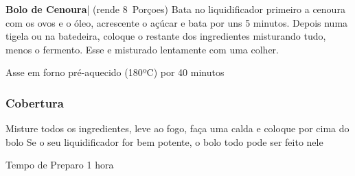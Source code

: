 \documentclass[10pt,a4paper]{article}
\begin{document}
 
\begin{recipe}{\textbf{Bolo de Cenoura}| (rende 8~Porçoes)}
Bata no liquidificador primeiro a cenoura com os ovos e o óleo, acrescente o açúcar e bata por uns 5 minutos.
Depois numa tigela ou na batedeira, coloque o restante dos ingredientes misturando tudo, menos o fermento.
Esse e misturado lentamente com uma colher.
 
Asse em forno pré-aquecido (180ºC) por 40 minutos
 
\subsubsection*{Cobertura}
 
 
Misture todos os ingredientes, leve ao fogo, faça uma calda e coloque por cima do bolo
Se o seu liquidificador for bem potente, o bolo todo pode ser feito nele
 
\item [Tempo de Preparo] 1 hora
 
\end{recipe}
\end{document}
